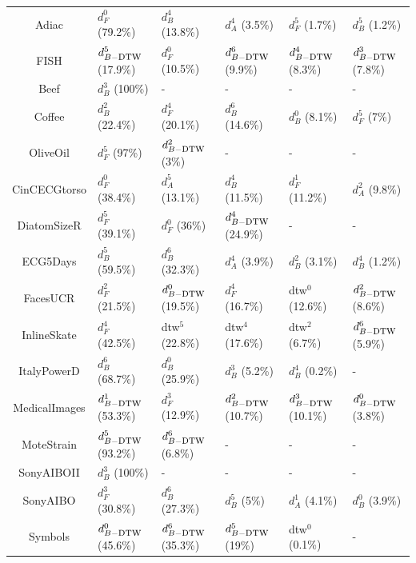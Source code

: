 \begin{table}[h!]
{\begin{tabular}{| c |  l l l l l |}
			\\
			Adiac				& $d_F^0$ (79.2\%)&   $d_B^4$ (13.8\%)&   $d_A^4$ (3.5\%)&   $d_F^5$ (1.7\%)&   $d_B^5$ (1.2\%)   
			\\
			FISH				& $d_{B-\mbox{\sc dtw}}^5$ (17.9\%)&   $d_F^0$ (10.5\%)&   $d_{B-\mbox{\sc dtw}}^6$ (9.9\%)&   $d_{B-\mbox{\sc dtw}}^4$ (8.3\%)&   $d_{B-\mbox{\sc dtw}}^3$ (7.8\%)  
			\\
			Beef				& $d_B^3$ (100\%)& - & - &-  & -  
			\\
			Coffee				& $d_B^2$ (22.4\%)&   $d_F^4$ (20.1\%)&   $d_B^6$ (14.6\%)&   $d_B^0$ (8.1\%)&   $d_F^5$ (7\%)   
			\\
			OliveOil			& $d_F^5$ (97\%)&   $d_{B-\mbox{\sc dtw}}^2$ (3\%)   & - & - & -
			\\
			CinCECGtorso		& $d_F^0$ (38.4\%)&   $d_A^5$ (13.1\%)&   $d_B^4$ (11.5\%)&   $d_F^1$ (11.2\%)&   $d_A^2$ (9.8\%)   
			\\
			DiatomSizeR 		& $d_F^5$ (39.1\%)&   $d_F^0$ (36\%)&   $d_{B-\mbox{\sc dtw}}^4$ (24.9\%)  & - & - 
			\\
			ECG5Days			& $d_B^5$ (59.5\%)&   $d_B^6$ (32.3\%)&   $d_A^4$ (3.9\%)&   $d_B^2$ (3.1\%)&   $d_B^4$ (1.2\%)  
			\\
			FacesUCR			& $d_F^2$ (21.5\%)&   $d_{B-\mbox{\sc dtw}}^0$ (19.5\%)&   $d_F^4$ (16.7\%)&   {\sc dtw}$^0$ (12.6\%)&   $d_{B-\mbox{\sc dtw}}^2$ (8.6\%)
			\\
			InlineSkate			& $d_F^4$ (42.5\%)&   {\sc dtw}$^5$ (22.8\%)&   {\sc dtw}$^4$ (17.6\%)&   {\sc dtw}$^2$ (6.7\%)&   $d_{B-\mbox{\sc dtw}}^6$ (5.9\%)   
			\\
			ItalyPowerD 		& $d_B^6$ (68.7\%)&   $d_B^0$ (25.9\%)&   $d_B^3$ (5.2\%)&   $d_B^4$ (0.2\%)   & -
			\\
			MedicalImages		& $d_{B-\mbox{\sc dtw}}^1$ (53.3\%)&   $d_F^3$ (12.9\%)&   $d_{B-\mbox{\sc dtw}}^2$ (10.7\%)&   $d_{B-\mbox{\sc dtw}}^3$ (10.1\%)&   $d_{B-\mbox{\sc dtw}}^0$ (3.8\%)   
			\\
			MoteStrain			& $d_{B-\mbox{\sc dtw}}^5$ (93.2\%)&   $d_{B-\mbox{\sc dtw}}^6$ (6.8\%)& -  & - & -
			\\
			SonyAIBOII			& $d_B^3$ (100\%)& -   & - & - &- 
			\\
			SonyAIBO			& $d_F^3$ (30.8\%)&   $d_B^6$ (27.3\%)&   $d_B^5$ (5\%)&   $d_A^1$ (4.1\%)&   $d_B^0$ (3.9\%)   
			\\
			Symbols 			& $d_{B-\mbox{\sc dtw}}^0$ (45.6\%)&   $d_{B-\mbox{\sc dtw}}^6$ (35.3\%)&   $d_{B-\mbox{\sc dtw}}^5$ (19\%)&   {\sc dtw}$^0$ (0.1\%)   & -
			\\

\end{tabular}}
\end{table}
